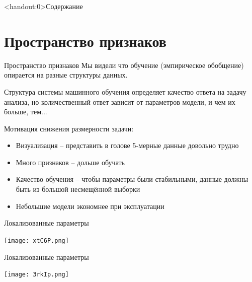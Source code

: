 \documentclass[pdf, intlimits, 9pt, unicode]{beamer}
\title[\disciplineshortname]{\docname}
\begin{document}
\maketitle

\begin{frame}<handout:0>{Содержание}\tableofcontents[pausesections]\end{frame}

\section{Пространство признаков}





\begin{frame}{Пространство признаков}
Мы видели что обучение {\color{red}(эмпирическое обобщение)} опирается на разные структуры данных.\pause

Структура системы машинного обучения определяет качество ответа на задачу анализа, но количественный ответ зависит от параметров модели, и чем их больше, тем...\pause

Мотивация снижения размерности задачи:

\begin{itemize}
\item Визуализация -- представить в голове 5-мерные данные довольно трудно\pause
\item Много признаков -- дольше обучать\pause
\item Качество обучения -- чтобы параметры были стабильными, данные должны быть из большой несмещённой выборки\pause
\item Небольшие модели экономнее при эксплуатации
\end{itemize}

\end{frame}





\begin{frame}{Локализованные параметры}\begin{center}\texttt{[image: xtC6P.png]}\end{center}\end{frame}

\begin{frame}{Локализованные параметры}\begin{center}\texttt{[image: 3rkIp.png]}\end{center}\end{frame}
\end{document}
